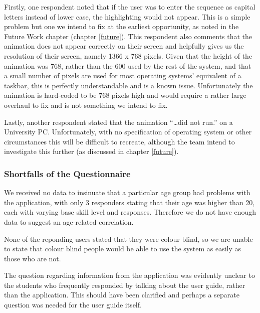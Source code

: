 Firstly, one respondent noted that if the user was to enter the
sequence as capital letters instead of lower case, the highlighting
would not appear.
This is a simple problem but one we intend to fix at the earliest
opportunity, as noted in the Future Work chapter (chapter
\ref{future}).
This respondent also comments that the animation does not appear
correctly on their screen and helpfully gives us the resolution of
their screen, namely 1366 x 768 pixels.
Given that the height of the animation was 768, rather than the 600
used by the rest of the system, and that a small number of pixels are
used for most operating systems' equivalent of a taskbar, this is
perfectly understandable and is a known issue.
Unfortunately the animation is hard-coded to be 768 pixels high and
would require a rather large overhaul to fix and is not something we
intend to fix.

Lastly, another respondent stated that the animation ``\ldots did not
run.'' on a University PC.
Unfortunately, with no specification of operating system or other
circumstances this will be difficult to recreate, although the team
intend to investigate this further (as discussed in chapter
\ref{future}).

\subsubsection{Shortfalls of the Questionnaire}
We received no data to insinuate that a particular age group had
problems with the application, with only 3 responders stating that
their age was higher than 20, each with varying base skill level and
responses.
Therefore we do not have enough data to suggest an age-related
correlation.

None of the reponding users stated that they were colour blind, so we
are unable to state that colour blind people would be able to use the
system as easily as those who are not.

The question regarding information from the application was evidently
unclear to the students who frequently responded by talking about the
user guide, rather than the application.
This should have been clarified and perhaps a separate question was
needed for the user guide itself.